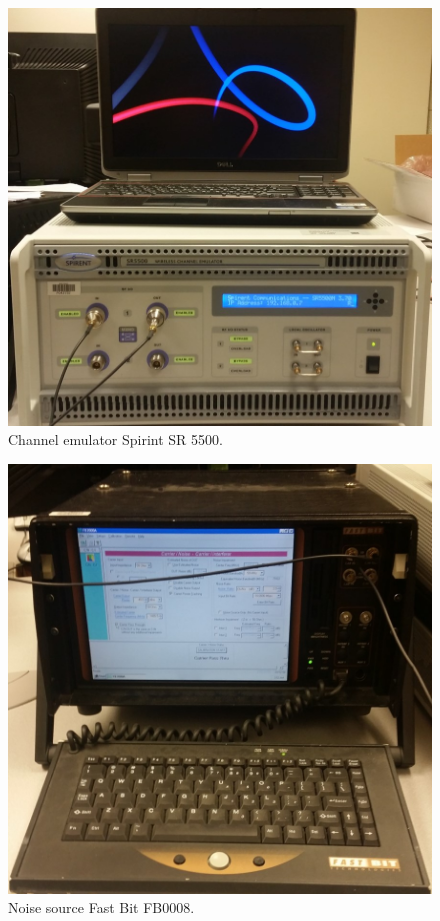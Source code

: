 \begin{figure}
	\centering\includegraphics[scale=0.5]{figures/eq_GPUimplementation/emu.jpg}
	\caption{Channel emulator Spirint SR 5500.}
	\label{fig:emu}
\end{figure}
\begin{figure}
	\centering\includegraphics[scale=0.5]{figures/eq_GPUimplementation/noise.jpg}
	\caption{Noise source Fast Bit FB0008.}
	\label{fig:noise}
\end{figure}
